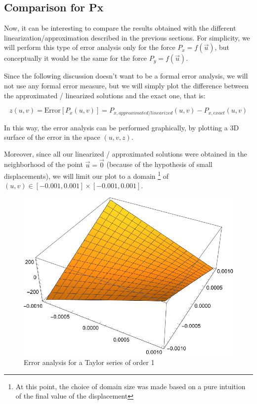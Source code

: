 \subsection{Comparison for Px}
\label{subsec:comparison}

Now, it can be interesting to compare the results obtained with the different linearization/approximation described in the previous sections.
For simplicity, we will perform this type of error analysis only for the force $P_x = f(\vec{u})$, but conceptually it would be the same for the force $P_y = f(\vec{u})$.

Since the following discussion doesn't want to be a formal error analysis, we will not use any formal error measure, but we will simply plot the difference between the approximated / linearized solutions and the exact one, that is:

\begin{equation}
    z(u,v) = \text{Error}[P_x(u,v)] = P_{x,approximated/linearized}(u,v) - P_{x,exact}(u,v)
\end{equation}

In this way, the error analysis can be performed graphically, by plotting a 3D surface of the error in the space $(u,v,z)$.

Moreover, since all our linearized / approximated solutions were obtained in the neighborhood of the point $\vec{u} = \vec{0}$ (because of the hypothesis of small displacements), we will limit our plot to a domain
\footnote{At this point, the choice of domain size was made based on a pure intuition of the final value of the displacement}
of $(u,v) \in [-0.001, 0.001] \times [-0.001, 0.001]$.

\begin{figure}[H]
    \centering
    \includegraphics[width=.5\textwidth]{./pdf/error_taylor_order_1}
    \caption{Error analysis for a Taylor series of order 1}
    \label{fig:error_taylor_order_1}
\end{figure}

